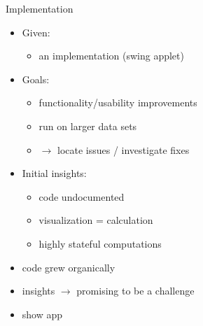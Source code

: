\documentclass[
  size=9pt,
  style=jefka,
  paper=screen,
  mode=print,
  display=slides,
  nohandoutpagebreaks,
  pauseslide,
  hlsections,
  fleqn,
  dvips,
  clock
]{powerdot}
\begin{document}
\begin{slide}{Implementation}
  \begin{itemize}
    \item Given:
    \begin{itemize}
      \item an implementation (swing applet)
    \end{itemize}
    \item Goals:
    \begin{itemize}
      \item functionality/usability improvements
      \item run on larger data sets
      \item $\rightarrow$ locate issues / investigate fixes
    \end{itemize}
    \item Initial insights:
    \begin{itemize}
      \item code undocumented
      \item visualization = calculation
      \item highly stateful computations
    \end{itemize}
  \end{itemize}
\end{slide}
\begin{note}{}
  \begin{itemize}
    \item code grew organically
    \item insights $\rightarrow$ promising to be a challenge
    \item show app
  \end{itemize}
\end{note}
\end{document}
